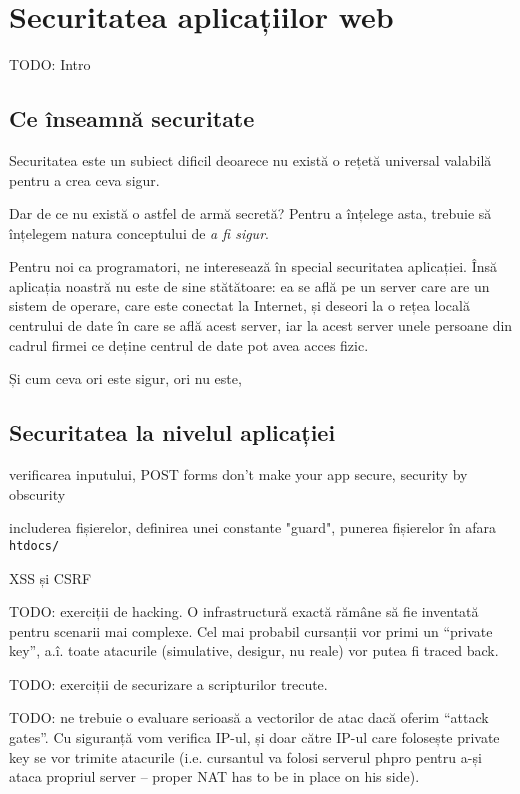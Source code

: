 \chapter{Securitatea aplicațiilor web}

\begin{chapsummary}
TODO: Intro
\end{chapsummary}

\section{Ce înseamnă securitate}
Securitatea este un subiect dificil deoarece nu există o rețetă
universal valabilă pentru a crea ceva sigur.

Dar de ce nu există
o astfel de armă secretă?
Pentru a înțelege asta, trebuie să înțelegem natura conceptului de
\textit{a fi sigur}. 

Pentru noi ca programatori, ne interesează în special securitatea
aplicației. Însă aplicația noastră nu este de sine stătătoare: ea
se află pe un server care are un sistem de operare, care este conectat
la Internet, și deseori la o rețea locală centrului de date în
care se află acest server, iar la acest server unele persoane
din cadrul firmei ce deține centrul de date pot avea acces fizic.

Și cum ceva ori este sigur, ori nu este, 
\section{Securitatea la nivelul aplicației}
verificarea inputului, POST forms don't make your app secure,
security by obscurity

includerea fișierelor, definirea unei constante "guard",
punerea fișierelor în afara \texttt{htdocs/}

XSS și CSRF


TODO: exerciții de hacking. O infrastructură exactă răm\^ane să fie inventată
pentru scenarii mai complexe. Cel mai probabil cursanții vor primi un
``private key'', a.\^i. toate atacurile (simulative, desigur, nu reale)
vor putea fi traced back.

TODO: exerciții de securizare a scripturilor trecute.

TODO: ne trebuie o evaluare serioasă a vectorilor de atac dacă oferim
``attack gates''. Cu siguranță vom verifica IP-ul, și doar către
IP-ul care folosește private key se vor trimite atacurile (i.e. cursantul
va folosi serverul phpro pentru a-și ataca propriul server -- proper NAT has to be
in place on his side).
